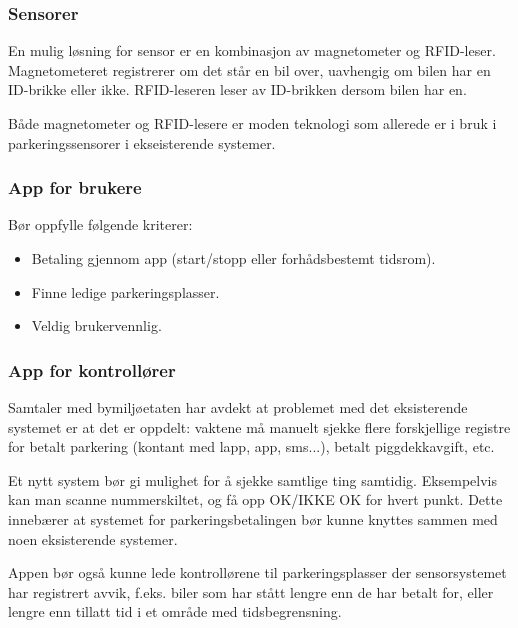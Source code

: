 \documentclass[a4paper, norsk, 12pt]{article}
\theoremstyle{remark}
\begin{document}
\subsubsection{Sensorer}
\label{ssub:sensorer}
En mulig løsning for sensor er en kombinasjon av magnetometer og RFID-leser. Magnetometeret registrerer om det står en bil over, uavhengig om bilen har en ID-brikke eller ikke. RFID-leseren leser av ID-brikken dersom bilen har en.

Både magnetometer og RFID-lesere er moden teknologi som allerede er i bruk i parkeringssensorer i ekseisterende systemer. 

\subsubsection{App for brukere}
\label{ssub:app_for_brukere}
Bør oppfylle følgende kriterer:
\begin{itemize}
	\item Betaling gjennom app (start/stopp eller forhådsbestemt tidsrom).
	\item Finne ledige parkeringsplasser.
	\item Veldig brukervennlig.
\end{itemize}

\subsubsection{App for kontrollører}
\label{ssub:kontrollor_app}
Samtaler med bymiljøetaten har avdekt at problemet med det eksisterende systemet er at det er oppdelt: vaktene må manuelt sjekke flere forskjellige registre for betalt parkering (kontant med lapp, app, sms...), betalt piggdekkavgift, etc.

Et nytt system bør gi mulighet for å sjekke samtlige ting samtidig. Eksempelvis kan man scanne nummerskiltet, og få opp OK/IKKE OK for hvert punkt. Dette innebærer at systemet for parkeringsbetalingen bør kunne knyttes sammen med noen eksisterende systemer.

Appen bør også kunne lede kontrollørene til parkeringsplasser der sensorsystemet har registrert avvik, f.eks. biler som har stått lengre enn de har betalt for, eller lengre enn tillatt tid i et område med tidsbegrensning.





\clearpage
\end{document}
